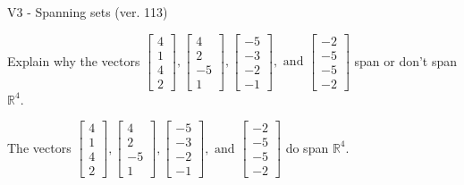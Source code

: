 \begin{exercise}
  \begin{exerciseTitle}V3 - Spanning sets (ver. 113)\end{exerciseTitle}
  \begin{exerciseStatement}
    Explain why the vectors \(\left[\begin{array}{r}
4 \\
1 \\
4 \\
2
\end{array}\right] , \left[\begin{array}{r}
4 \\
2 \\
-5 \\
1
\end{array}\right] , \left[\begin{array}{r}
-5 \\
-3 \\
-2 \\
-1
\end{array}\right] , \text{ and } \left[\begin{array}{r}
-2 \\
-5 \\
-5 \\
-2
\end{array}\right]\) span or don't span \(\mathbb{R}^4\). 
	


  \end{exerciseStatement}
  \begin{exerciseAnswer}
   The vectors \(\left[\begin{array}{r}
4 \\
1 \\
4 \\
2
\end{array}\right] , \left[\begin{array}{r}
4 \\
2 \\
-5 \\
1
\end{array}\right] , \left[\begin{array}{r}
-5 \\
-3 \\
-2 \\
-1
\end{array}\right] , \text{ and } \left[\begin{array}{r}
-2 \\
-5 \\
-5 \\
-2
\end{array}\right]\) 
  	 do  
	span \(\mathbb{R}^4\).
  


  \end{exerciseAnswer}
\end{exercise}